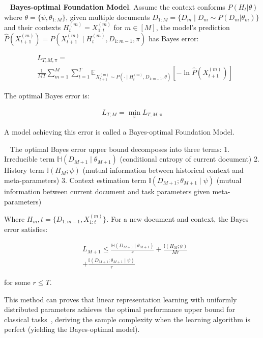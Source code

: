     \begin{definition}~\cite{JeonLLR24}
    \textbf{Bayes-optimal Foundation Model}. Assume the context conforms \( P(H_t|\theta) \) where \(\theta = \{\psi, \theta_{1:M}\}\), given multiple documents \( D_{1:M} = \{ D_m \mid D_m \sim P(D_m|\theta_m) \} \) and their contexts \( H_t^{(m)} = X_{1:t}^{(m)} \) for \( m \in [M] \), the model's prediction \( \hat P(X_{t+1}^{(m)}) = P(X_{t+1}^{(m)} \mid H_t^{(m)}, D_{1:m-1}, \pi) \) has Bayes error:
    
    \begin{equation}
    \begin{aligned}
        & L_{T,M,\pi} = \\
        & \frac{1}{MT} \sum_{m=1}^{M} \sum_{t=1}^{T} \mathbb{E}_{X_{t+1}^{(m)} \sim P(\cdot \mid H_t^{(m)}, D_{1:m-1}, \theta)} \left[ -\ln \hat P(X_{t+1}^{(m)}) \right]
    \end{aligned}
    \end{equation}
    
    The optimal Bayes error is:

    \begin{equation}
        \begin{aligned}
            L_{T,M} = \min_{\pi} L_{T,M,\pi}
        \end{aligned}
    \end{equation}
    
    
    A model achieving this error is called a Bayes-optimal Foundation Model.
    \end{definition}
    
    \begin{lemma}~\cite{JeonLLR24}
    The optimal Bayes error upper bound decomposes into three terms: 
    1. Irreducible term \( \mathbb{H}(D_{M+1} \mid \theta_{M+1}) \) (conditional entropy of current document)
    2. History term \( \mathbb{I}(H_M; \psi) \) (mutual information between historical context and meta-parameters)
    3. Context estimation term \( \mathbb{I}(D_{M+1}; \theta_{M+1} \mid \psi) \) (mutual information between current document and task parameters given meta-parameters)
    
    Where \( H_m,t = \{ D_{1:m-1}, X_{1:t}^{(m)} \} \). For a new document and context, the Bayes error satisfies:

    \begin{equation}
        \begin{aligned}
            & L_{M+1} \leq \frac{\mathbb{H}(D_{M+1} \mid \theta_{M+1})}{r} + \frac{\mathbb{I}(H_M; \psi)}{Mr} \\
            & + \frac{\mathbb{I}(D_{M+1}; \theta_{M+1} \mid \psi)}{r}
        \end{aligned}
    \end{equation}
    
    for some \( r \leq T \). 
    \end{lemma}
    
    This method can proves that linear representation learning with uniformly distributed parameters achieves the optimal performance upper bound for classical tasks~\cite{JeonLLR24}, deriving the sample complexity when the learning algorithm is perfect (yielding the Bayes-optimal model).